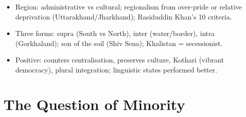 \begin{QuickRevision}
\begin{itemize}
\item Region: administrative vs cultural; regionalism from over-pride or relative deprivation (Uttarakhand/Jharkhand); Rasiduddin Khan's 10 criteria.
\item Three forms: supra (South vs North), inter (water/border), intra (Gorkhaland); son of the soil (Shiv Sena); Khalistan = secessionist.
\item Positive: counters centralisation, preserves culture, Kothari (vibrant democracy), plural integration; linguistic states performed better.
\end{itemize}
\end{QuickRevision}

\section{The Question of Minority}

